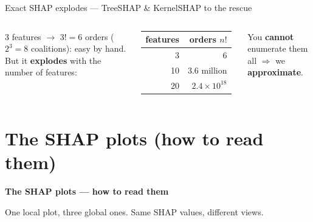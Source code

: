 \documentclass[aspectratio=169]{beamer}
\begin{document}
\begin{frame}{Exact SHAP explodes --- TreeSHAP \& KernelSHAP to the rescue}
  \begin{columns}[T]
    3 features $\to$ $3! = 6$ orders ($2^3 = 8$ coalitions): easy by hand. But it \textbf{explodes}
    with the number of features:
    \vskip 4pt
    \centering\small
    \renewcommand{\arraystretch}{1.2}
    \begin{tabular}{r r}
      \textbf{features} & \textbf{orders} $n!$ \\
      \hline
      3  & 6 \\
      10 & $3.6$ million \\
      20 & $2.4\times10^{18}$ \\
      \hline
    \end{tabular}
    \vskip 4pt
    \raggedright You \textbf{cannot} enumerate them all $\Rightarrow$ we \textbf{approximate}.
    \vskip 8pt
  \end{columns}
\end{frame}

\section{The SHAP plots (how to read them)}

\begin{frame}[plain]
  \vfill
  \begin{center}
    {\Large\color{popblue}\textbf{The SHAP plots --- how to read them}}\\[0.9em]
    \begin{minipage}{0.82\textwidth}\centering\small
      One local plot, three global ones. Same SHAP values, different views.
    \end{minipage}
  \end{center}
  \vfill
\end{frame}
\end{document}
